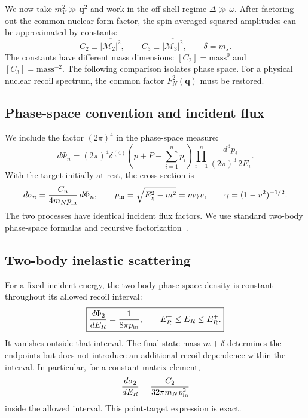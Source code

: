 \documentclass[prd,showpacs,preprintnumbers,amsmath,amssymb,twocolumn,
superscriptaddress,notitlepage]{revtex4-2}
\newcommand{\Msq}[1]{\overline{|\mathcal{M}_{#1}|^2}}
\newcommand{\qvec}{\boldsymbol{q}}
\begin{document}
We now take $m_V^2\gg\qvec^2$ and work in the off-shell regime
$\Delta\gg\omega$. After factoring out the common nuclear form factor,
the spin-averaged squared amplitudes can be approximated by constants:
\begin{equation}
C_2\equiv\Msq{2},\qquad C_3\equiv\Msq{3},\qquad
\delta=m_s.
\label{eq:phase-constants}
\end{equation}
The constants have different mass dimensions:
$[C_2]=\text{mass}^0$ and $[C_3]=\text{mass}^{-2}$.
The following comparison isolates phase space. For a physical nuclear
recoil spectrum, the common factor $F_N^2(\qvec)$ must be restored.

\subsection{Phase-space convention and incident flux}

We include the factor $(2\pi)^4$ in the phase-space measure:
\begin{equation}
d\Phi_n=(2\pi)^4
\delta^{(4)}\!\left(p+P-\sum_{i=1}^n p_i\right)
\prod_{i=1}^n\frac{d^3p_i}{(2\pi)^3\,2E_i}.
\label{eq:phase-measure}
\end{equation}
With the target initially at rest, the cross section is
\begin{equation}
d\sigma_n=\frac{C_n}{4m_Np_{\rm in}}\,d\Phi_n,\qquad
p_{\rm in}=\sqrt{E_\chi^2-m^2}=m\gamma v,\qquad
\gamma=(1-v^2)^{-1/2}.
\label{eq:phase-flux}
\end{equation}
The two processes have identical incident flux factors.
We use standard two-body phase-space formulas and recursive
factorization~\cite{PDG:2024kinematics}.

\subsection{Two-body inelastic scattering}

For a fixed incident energy, the two-body phase-space density is constant
throughout its allowed recoil interval:
\begin{equation}
\boxed{
\frac{d\Phi_2}{dE_R}=\frac{1}{8\pi p_{\rm in}},
\qquad E_R^-\leq E_R\leq E_R^+.
}
\label{eq:phase-two-er}
\end{equation}
It vanishes outside that interval.
The final-state mass $m+\delta$ determines the endpoints but does not
introduce an additional recoil dependence within the interval.
In particular, for a constant matrix element,
\begin{equation}
\frac{d\sigma_2}{dE_R}
=\frac{C_2}{32\pi m_Np_{\rm in}^2}
\end{equation}
inside the allowed interval. This point-target expression is exact.
\end{document}
